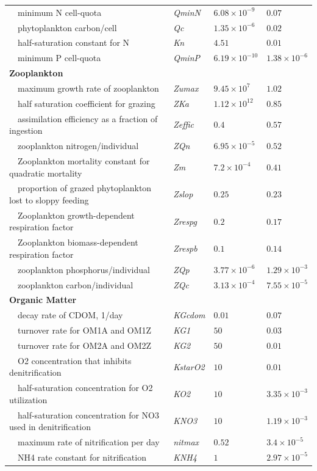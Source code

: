 \documentclass[review]{elsarticle}\usepackage[]{graphicx}\usepackage[]{color}
\begin{document}
\begin{table}[!tbp]
{\begin{center}
\begin{tabular}{llll}
~~minimum N cell-quota&\textit{QminN}&$6.08\times 10^{-9}$&$0.07$\tabularnewline
~~phytoplankton carbon/cell&\textit{Qc}&$1.35\times 10^{-6}$&$0.02$\tabularnewline
~~half-saturation constant for N&\textit{Kn}&$4.51$&$0.01$\tabularnewline
~~minimum P cell-quota&\textit{QminP}&$6.19\times 10^{-10}$&$1.38\times 10^{-6}$\tabularnewline
\hline
{\bfseries Zooplankton}&&&\tabularnewline
~~maximum growth rate of zooplankton&\textit{Zumax}&$9.45\times 10^{7}$&$1.02$\tabularnewline
~~half saturation coefficient for grazing&\textit{ZKa}&$1.12\times 10^{12}$&$0.85$\tabularnewline
~~assimilation efficiency as a fraction of ingestion&\textit{Zeffic}&$0.4$&$0.57$\tabularnewline
~~zooplankton nitrogen/individual&\textit{ZQn}&$6.95\times 10^{-5}$&$0.52$\tabularnewline
~~Zooplankton mortality constant for quadratic mortality&\textit{Zm}&$7.2\times 10^{-4}$&$0.41$\tabularnewline
~~proportion of grazed phytoplankton lost to sloppy feeding&\textit{Zslop}&$0.25$&$0.23$\tabularnewline
~~Zooplankton growth-dependent respiration factor&\textit{Zrespg}&$0.2$&$0.17$\tabularnewline
~~Zooplankton biomass-dependent respiration factor&\textit{Zrespb}&$0.1$&$0.14$\tabularnewline
~~zooplankton phosphorus/individual&\textit{ZQp}&$3.77\times 10^{-6}$&$1.29\times 10^{-3}$\tabularnewline
~~zooplankton carbon/individual&\textit{ZQc}&$3.13\times 10^{-4}$&$7.55\times 10^{-5}$\tabularnewline
\hline
{\bfseries Organic Matter}&&&\tabularnewline
~~decay rate of CDOM, 1/day&\textit{KGcdom}&$0.01$&$0.07$\tabularnewline
~~turnover rate for OM1A and OM1Z&\textit{KG1}&$50$&$0.03$\tabularnewline
~~turnover rate for OM2A and OM2Z&\textit{KG2}&$50$&$0.01$\tabularnewline
~~O2 concentration that inhibits denitrification&\textit{KstarO2}&$10$&$0.01$\tabularnewline
~~half-saturation concentration for O2 utilization&\textit{KO2}&$10$&$3.35\times 10^{-3}$\tabularnewline
~~half-saturation concentration for NO3 used in denitrification&\textit{KNO3}&$10$&$1.19\times 10^{-3}$\tabularnewline
~~maximum rate of nitrification per day&\textit{nitmax}&$0.52$&$3.4\times 10^{-5}$\tabularnewline
~~NH4 rate constant for nitrification&\textit{KNH4}&$1$&$2.97\times 10^{-5}$\tabularnewline
\hline
\end{tabular}\end{center}}
\end{table}
\end{document}
